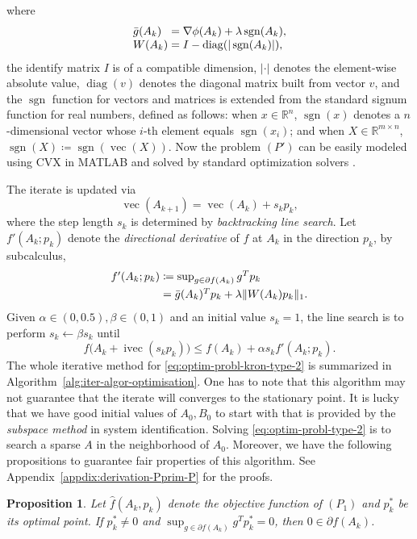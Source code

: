 \documentclass[letterpaper,10pt,journal,final]{IEEEtran}
\newtheorem{proposition}[theorem]{Proposition}
\theoremstyle{definition}
\theoremstyle{remark}
\newcommand{\diag}{\operatorname{diag}}
\newcommand{\kvec}{\operatorname{vec}}
\newcommand{\ikvec}{\operatorname{ivec}}
\newcommand{\sgn}{\operatorname{sgn}}
\begin{document}
where
\begin{equation}
  \label{eq:formula-gbar-W}
  \begin{array}{l@{\;}l}
    \bar{g}(A_k) &= \nabla \phi(A_k) + \lambda \sgn(A_k),\\
    W(A_k) &= I - \diag(|\sgn(A_k)|),
  \end{array}
\end{equation}
the identify matrix $I$ is of a compatible dimension, $|\cdot|$ denotes the element-wise absolute value, $\diag(v)$ denotes the diagonal matrix built from vector $v$, and the $\sgn$ function for vectors and matrices is extended from the standard signum function for real numbers, defined as follows: when $x \in \mathbb{R}^n$, $\sgn(x)$ denotes a $n$-dimensional vector whose $i$-th element equals $\sgn(x_i)$; and when $X \in \mathbb{R}^{m \times n}$, $\sgn(X) \coloneqq \sgn(\kvec(X))$.
Now the problem $(P')$ can be easily modeled using CVX in MATLAB and solved by
standard optimization solvers \cite{cvx-manual}.

The iterate is updated via
\begin{equation}
  \label{eq:update-rule-plus-line-search}
  \kvec(A_{k+1}) = \kvec(A_k) + s_k p_k,
\end{equation}
where the step length $s_k$ is determined by \emph{backtracking line search}.
Let $f'(A_k; p_k)$ denote the \emph{directional derivative} of $f$ at $A_k$ in the direction $p_k$, by subcalculus,
\begin{equation}
  \label{eq:directional-derivative}
  \begin{array}{l@{\;}l}
    f'(A_k; p_k) &\coloneqq \sup_{g \in \partial f(A_k)} g^T p_k\\[4pt]
                 &= \bar{g}(A_k)^T p_k + \lambda \|W(A_k) p_k\|_1.
  \end{array}
\end{equation}
Given $\alpha \in (0, 0.5), \beta \in (0,1)$ and an initial value $s_k = 1$, the line search is to perform $s_k \leftarrow \beta s_k$ until
\begin{equation}
  \label{eq:line-search}
  f \big(A_k + \ikvec(s_kp_k)\big) \leq f(A_k) + \alpha s_k f'(A_k; p_k).
\end{equation}
The whole iterative method for \eqref{eq:optim-probl-kron-type-2} is summarized
in Algorithm~\ref{alg:iter-algor-optimisation}. One has to note that this
algorithm may not guarantee that the iterate will converges to the stationary
point. It is lucky that we have good initial values of $A_0, B_0$ to start with
that is provided by the \emph{subspace method} in system identification. Solving
\eqref{eq:optim-probl-type-2} is to search a sparse $A$ in the neighborhood of
$A_0$.  Moreover, we have the following propositions to guarantee fair
properties of this algorithm. See Appendix~\ref{appdix:derivation-Pprim-P} for
the proofs.
\begin{proposition}
  \label{prop:no-zero-p-before-local-optima}
  Let $\hat{f}(A_k, p_k)$ denote the objective function of $(P_1)$ and $p_k^*$ be its
  optimal point. If $p_k^* \neq 0$ and $\sup_{g\in \partial f(A_k)} g^T p_k^* = 0$, then
  $0 \in \partial f(A_k)$.
\end{proposition}
\end{document}
